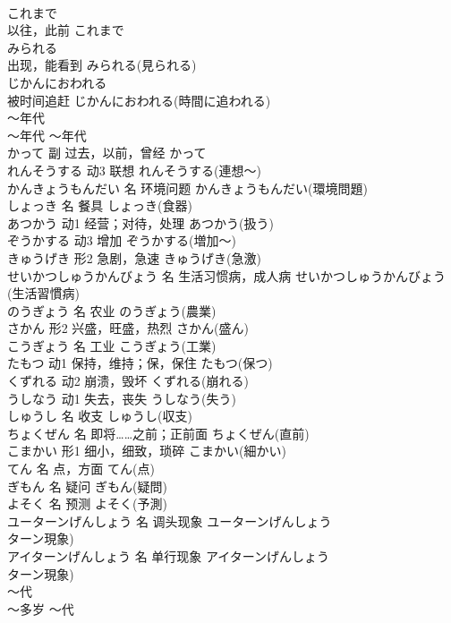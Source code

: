 \documentclass[8pt]{extreport}
\begin{document}
\begin{CJK}{UTF8}{min}
\\	これまで	
\\	以往，此前	これまで	
\\	みられる	
\\	出现，能看到	みられる(見られる)	
\\	じかんにおわれる	
\\	被时间追赶	じかんにおわれる(時間に追われる)	
\\	～年代	
\\	～年代	～年代	
\\	かって	副	过去，以前，曾经	かって	
\\	れんそうする	动3	联想	れんそうする(連想～)	
\\	かんきょうもんだい	名	环境问题	かんきょうもんだい(環境問題)	
\\	しょっき	名	餐具	しょっき(食器)	
\\	あつかう	动1	经营；对待，处理	あつかう(扱う)	
\\	ぞうかする	动3	增加	ぞうかする(増加～)	
\\	きゅうげき	形2	急剧，急速	きゅうげき(急激)	
\\	せいかつしゅうかんびょう	名	生活习惯病，成人病	せいかつしゅうかんびょう(生活習慣病)	
\\	のうぎょう	名	农业	のうぎょう(農業)	
\\	さかん	形2	兴盛，旺盛，热烈	さかん(盛ん)	
\\	こうぎょう	名	工业	こうぎょう(工業)	
\\	たもつ	动1	保持，维持；保，保住	たもつ(保つ)	
\\	くずれる	动2	崩溃，毁坏	くずれる(崩れる)	
\\	うしなう	动1	失去，丧失	うしなう(失う)	
\\	しゅうし	名	收支	しゅうし(収支)	
\\	ちょくぜん	名	即将……之前；正前面	ちょくぜん(直前)	
\\	こまかい	形1	细小，细致，琐碎	こまかい(細かい)	
\\	てん	名	点，方面	てん(点)	
\\	ぎもん	名	疑问	ぎもん(疑問)	
\\	よそく	名	预测	よそく(予測)	
\\	ユーターンげんしょう	名	调头现象	ユーターンげんしょう
\\	ターン現象)	
\\	アイターンげんしょう	名	单行现象	アイターンげんしょう
\\	ターン現象)	
\\	～代	
\\	～多岁	～代	

\end{CJK}
\end{document}
